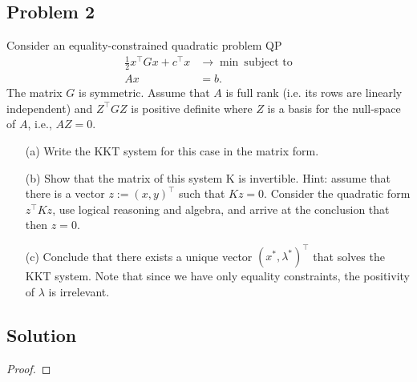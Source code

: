 \documentclass[12pt]{report}
\begin{document}
\begin{problem}%
\subsection*{Problem 2}

Consider an equality-constrained quadratic problem QP 
\begin{align*}
    \frac{1}{2}x^\top G x + c^\top x &\rightarrow \min ~\text{subject to}\\
    Ax &= b.
\end{align*}
The matrix $G$ is symmetric. Assume that $A$ is full rank (i.e. its rows are linearly independent) and $Z^\top GZ$ is positive definite where $Z$ is a basis for the null-space of $A$, i.e., $AZ = 0$.
\begin{enumerate}
    \item [(a)]
    Write the KKT system for this case in the matrix form.
    \item [(b)]
    Show that the matrix of this system K is invertible. Hint: assume that there is a vector $z := (x, y)^\top$ such that $Kz = 0$. Consider the quadratic form $z^\top Kz$, use logical reasoning and algebra, and arrive at the conclusion that then $z = 0$.
    \item [(c)]
    Conclude that there exists a unique vector $(x^*, \lambda^*)^\top$ that solves the KKT system. Note that since we have only equality constraints, the positivity of $\lambda$ is irrelevant.
\end{enumerate}

\subsection*{Solution}
\begin{proof}


\end{proof}
\end{problem}
\end{document}
